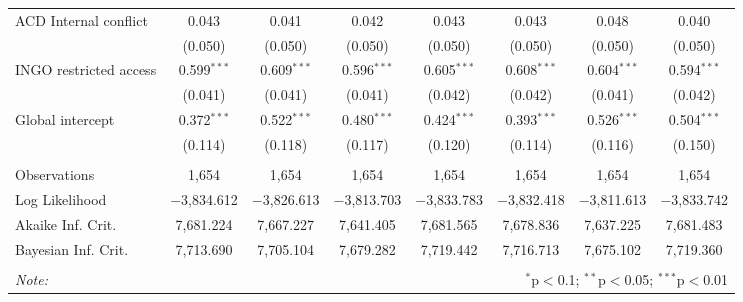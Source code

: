 \begin{sidewaystable}[!htbp]
\begin{tabular}{@{\extracolsep{5pt}}lccccccc}
  ACD Internal conflict & 0.043 & 0.041 & 0.042 & 0.043 & 0.043 & 0.048 & 0.040 \\ 
  & (0.050) & (0.050) & (0.050) & (0.050) & (0.050) & (0.050) & (0.050) \\ 
  INGO restricted access & 0.599$^{***}$ & 0.609$^{***}$ & 0.596$^{***}$ & 0.605$^{***}$ & 0.608$^{***}$ & 0.604$^{***}$ & 0.594$^{***}$ \\ 
  & (0.041) & (0.041) & (0.041) & (0.042) & (0.042) & (0.041) & (0.042) \\ 
  Global intercept & 0.372$^{***}$ & 0.522$^{***}$ & 0.480$^{***}$ & 0.424$^{***}$ & 0.393$^{***}$ & 0.526$^{***}$ & 0.504$^{***}$ \\ 
  & (0.114) & (0.118) & (0.117) & (0.120) & (0.114) & (0.116) & (0.150) \\ 
 \hline \\[-1.8ex] 
Observations & 1,654 & 1,654 & 1,654 & 1,654 & 1,654 & 1,654 & 1,654 \\ 
Log Likelihood & $-$3,834.612 & $-$3,826.613 & $-$3,813.703 & $-$3,833.783 & $-$3,832.418 & $-$3,811.613 & $-$3,833.742 \\ 
Akaike Inf. Crit. & 7,681.224 & 7,667.227 & 7,641.405 & 7,681.565 & 7,678.836 & 7,637.225 & 7,681.483 \\ 
Bayesian Inf. Crit. & 7,713.690 & 7,705.104 & 7,679.282 & 7,719.442 & 7,716.713 & 7,675.102 & 7,719.360 \\ 
\hline 
\hline \\[-1.8ex] 
\textit{Note:}  & \multicolumn{7}{r}{$^{*}$p$<$0.1; $^{**}$p$<$0.05; $^{***}$p$<$0.01} \\ 
\end{tabular} 
\end{sidewaystable} 

